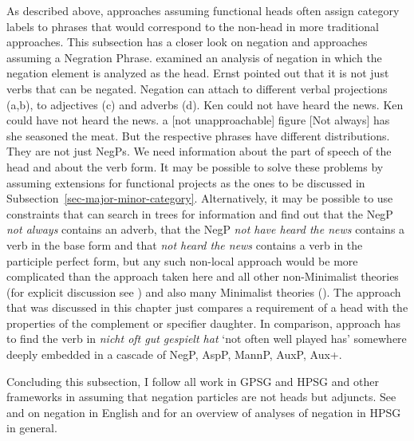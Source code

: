 As described above, approaches assuming functional heads often assign category labels to phrases
that would correspond to the non-head in more traditional approaches. This subsection has a
closer look on negation and approaches assuming a Negration Phrase. \citet{Ernst92a} examined an analysis of
negation in which the negation element is analyzed as the head. Ernst pointed out that it is
not just verbs that can be negated. Negation can attach to different verbal projections (a,b), to adjectives (c)
and adverbs (d).
\eal
\ex Ken could not have heard the news.
\ex Ken could have not heard the news.
\ex a [not unapproachable] figure
\ex {}[Not always] has she seasoned the meat.
\zl
But the respective phrases have different distributions. They are not just NegPs. We need
information about the part of speech of the head and about the verb form. It may be possible to
solve these problems by assuming extensions for functional projects as the ones to be discussed in
Subsection~\ref{sec-major-minor-category}. Alternatively, it may be possible to use constraints that
can search in trees for information and find out that the NegP \emph{not always} contains an adverb,
that the NegP \emph{not have heard the news} contains a verb in the base form and that \emph{not
  heard the news} contains a verb in the participle perfect form, but any such non-local approach
would be more complicated than the approach taken here and all other non-Minimalist theories (for
explicit discussion see \citealt{Sag2007a}) and also many Minimalist theories (\eg \citealt[]{Abraham2005a}). The approach that was discussed in this chapter just compares a requirement
  of a head with the properties of the complement or specifier daughter. In comparison, 
  approach has to find the verb in \emph{nicht oft gut gespielt hat} `not often well played has'
  somewhere deeply embedded in a cascade of NegP, AspP, MannP, AuxP, Aux+. 

Concluding this subsection, I follow all work in GPSG and HPSG and other frameworks in assuming that
negation particles are not heads but adjuncts. See  and  on negation in English and
 for an overview of analyses of negation in HPSG in general.

